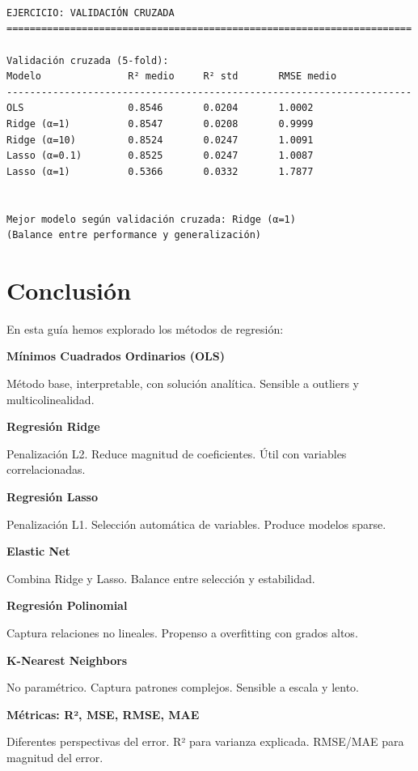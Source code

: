 \documentclass[
  doc,
  floatsintext,
  longtable,
  a4paper,
  nolmodern,
  notxfonts,
  notimes,
  12pt,
  colorlinks=true,linkcolor=blue,citecolor=blue,urlcolor=blue]{apa7}
\begin{document}
\begin{verbatim}



EJERCICIO: VALIDACIÓN CRUZADA
======================================================================

Validación cruzada (5-fold):
Modelo               R² medio     R² std       RMSE medio     
----------------------------------------------------------------------
OLS                  0.8546       0.0204       1.0002         
Ridge (α=1)          0.8547       0.0208       0.9999         
Ridge (α=10)         0.8524       0.0247       1.0091         
Lasso (α=0.1)        0.8525       0.0247       1.0087         
Lasso (α=1)          0.5366       0.0332       1.7877         


Mejor modelo según validación cruzada: Ridge (α=1)
(Balance entre performance y generalización)
\end{verbatim}

\section{Conclusión}\label{conclusiuxf3n}

En esta guía hemos explorado los métodos de regresión:

\textbf{Mínimos Cuadrados Ordinarios (OLS)}

Método base, interpretable, con solución analítica. Sensible a outliers
y multicolinealidad.

\textbf{Regresión Ridge}

Penalización L2. Reduce magnitud de coeficientes. Útil con variables
correlacionadas.

\textbf{Regresión Lasso}

Penalización L1. Selección automática de variables. Produce modelos
sparse.

\textbf{Elastic Net}

Combina Ridge y Lasso. Balance entre selección y estabilidad.

\textbf{Regresión Polinomial}

Captura relaciones no lineales. Propenso a overfitting con grados altos.

\textbf{K-Nearest Neighbors}

No paramétrico. Captura patrones complejos. Sensible a escala y lento.

\textbf{Métricas: R², MSE, RMSE, MAE}

Diferentes perspectivas del error. R² para varianza explicada. RMSE/MAE
para magnitud del error.
\end{document}
